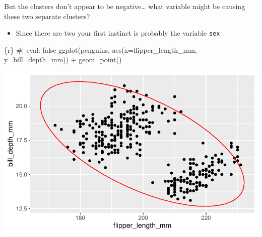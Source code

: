 \documentclass[
  letterpaper,
  DIV=11,
  numbers=noendperiod]{scrreprt}
\newenvironment{Shaded}{\begin{snugshade}}{\end{snugshade}}
\newcommand{\AttributeTok}[1]{\textcolor[rgb]{0.40,0.45,0.13}{#1}}
\newcommand{\CommentTok}[1]{\textcolor[rgb]{0.37,0.37,0.37}{#1}}
\newcommand{\FunctionTok}[1]{\textcolor[rgb]{0.28,0.35,0.67}{#1}}
\newcommand{\InformationTok}[1]{\textcolor[rgb]{0.37,0.37,0.37}{#1}}
\newcommand{\NormalTok}[1]{\textcolor[rgb]{0.00,0.23,0.31}{#1}}
\newcommand{\SpecialCharTok}[1]{\textcolor[rgb]{0.37,0.37,0.37}{#1}}
\providecommand{\tightlist}{%
  \setlength{\itemsep}{0pt}\setlength{\parskip}{0pt}}\usepackage{longtable,booktabs,array}
\begin{document}
\begin{tcolorbox}[enhanced jigsaw, colframe=quarto-callout-important-color-frame, breakable, colback=white, toprule=.15mm, leftrule=.75mm, left=2mm, opacityback=0, rightrule=.15mm, arc=.35mm, bottomrule=.15mm]

But the clusters don't appear to be negative\ldots{} what variable might
be causing these two separate clusters?

\begin{itemize}
\tightlist
\item
  Since there are two your first instinct is probably the variable
  \texttt{sex}
\end{itemize}

\end{tcolorbox}

\begin{tcolorbox}[enhanced jigsaw, colframe=quarto-callout-note-color-frame, breakable, colback=white, toprule=.15mm, leftrule=.75mm, left=2mm, opacityback=0, rightrule=.15mm, arc=.35mm, bottomrule=.15mm]

\begin{Shaded}
\begin{Highlighting}[]
\InformationTok{\textasciigrave{}\textasciigrave{}\textasciigrave{}\{r\}}
\CommentTok{\#| eval: false}
\FunctionTok{ggplot}\NormalTok{(penguins, }\FunctionTok{aes}\NormalTok{(}\AttributeTok{x=}\NormalTok{flipper\_length\_mm, }\AttributeTok{y=}\NormalTok{bill\_depth\_mm)) }\SpecialCharTok{+}
  \FunctionTok{geom\_point}\NormalTok{()}
\InformationTok{\textasciigrave{}\textasciigrave{}\textasciigrave{}}
\end{Highlighting}
\end{Shaded}

\includegraphics{03-content_files/figure-pdf/unnamed-chunk-7-1.pdf}

\end{tcolorbox}
\end{document}
